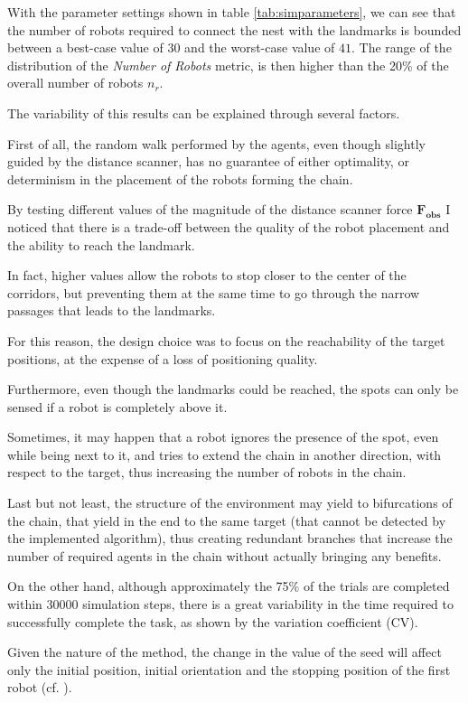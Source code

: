 With the parameter settings shown in table \ref{tab:simparameters}, we can see that the number of robots required to connect the nest with the landmarks is bounded between a best-case value of $30$ and the worst-case value of $41$.
The range of the distribution of the \emph{Number of Robots} metric, is then higher than the 20\% of the overall number of robots $n_r$.

The variability of this results can be explained through several factors.

First of all, the random walk performed by the agents, even though slightly guided by the distance scanner, has no guarantee of either optimality, or determinism in the placement of the robots forming the chain.

By testing different values of the magnitude of the distance scanner force $\mathbf{F_{obs}}$ I noticed that there is a trade-off between the quality of the robot placement and the ability to reach the landmark.

In fact, higher values allow the robots to stop closer to the center of the corridors, but preventing them at the same time to go through the narrow passages that leads to the landmarks.

For this reason, the design choice was to focus on the reachability of the target positions, at the expense of a loss of positioning quality.

Furthermore, even though the landmarks could be reached, the spots can only be sensed if a robot is completely above it.
 
Sometimes, it may happen that a robot ignores the presence of the spot, even while being next to it, and tries to extend the chain in another direction, with respect to the target, thus increasing the number of robots in the chain.

Last but not least, the structure of the environment may yield to bifurcations of the chain, that yield in the end to the same target (that cannot be detected by the implemented algorithm), thus creating redundant branches that increase the number of required agents in the chain without actually bringing any benefits.

On the other hand, although approximately the 75\% of the trials are completed within 30000 simulation steps, there is a great variability in the time required to successfully complete the task, as shown by the variation coefficient (CV).

Given the nature of the method, the change in the value of the seed will affect only the initial position, initial orientation and the stopping position of the first robot (cf. ).

